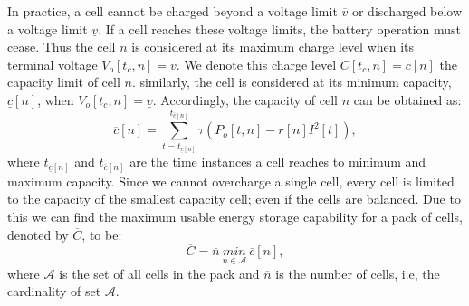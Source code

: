 \documentclass[10pt,twocolumn]{IEEEtran}
\begin{document}
\noindent In practice,  a cell cannot be charged beyond a voltage limit $\overline{v}$ or discharged below a voltage limit $\underline{v}$.
If a cell reaches these voltage limits, the battery operation must cease.
Thus the cell $n$ is considered at its maximum charge level when its terminal voltage $V_{o}[t_c,n]=\overline{v}$.
We denote this charge level $C[t_c,n]=\overline{c}[n]$  the capacity limit of cell $n$.
similarly, the cell is considered at its minimum capacity, $\underline{c}[n]$, when $V_{o}[t_c,n]=\underline{v}$.
Accordingly, the capacity of cell $n$ can be obtained  as:
%
\begin{equation}
\overline{c}[n]=   \sum_{t=t_{\underline{c}[n]}}^{t_{\overline{c}[n]} } \tau(P_{o}[t,n] - r[n]I^2[t]),
\end{equation}
\noindent where $t_{\underline{c}[n]}$ and $t_{\overline{c}[n]}$ are the time instances a cell reaches to minimum and maximum capacity.
Since we cannot overcharge a single cell, every cell is limited to the capacity of the smallest capacity cell; even if the cells are balanced.
Due to this we can find the maximum usable energy storage capability for a pack of cells, denoted by $ \overline{C}$,  to be:
%
\begin{equation}
\overline{C}=\overline{n} \ \underset{n\in \mathcal{A}}{min} \ \overline{c}[n] ,
\label{eq:lhscap}
\end{equation}
\noindent where $\mathcal{A}$ is the set of all cells in the pack and $\overline{n}$ is the number of cells, i.e, the cardinality of set $\mathcal{A}$. 
\end{document}
